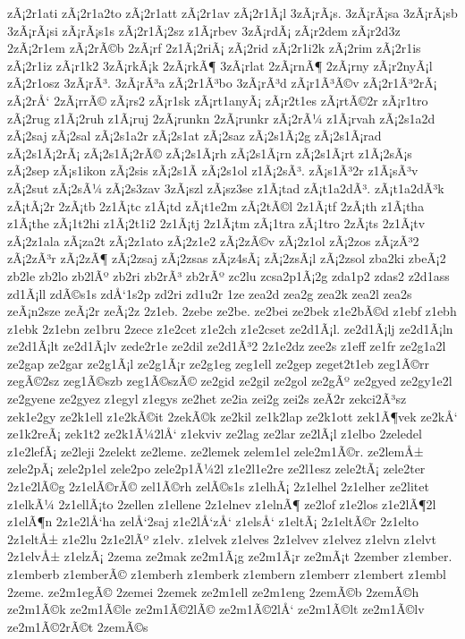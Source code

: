 {zÃ¡2r1ati
zÃ¡2r1a2to
zÃ¡2r1att
zÃ¡2r1av
zÃ¡2r1Ã¡l
3zÃ¡rÃ¡s.
3zÃ¡rÃ¡sa
3zÃ¡rÃ¡sb
3zÃ¡rÃ¡si
zÃ¡rÃ¡s1s
zÃ¡2r1Ã¡2sz
z1Ã¡rbev
3zÃ¡rdÃ¡
zÃ¡r2dem
zÃ¡r2d3z
2zÃ¡2r1em
zÃ¡2rÃ©b
2zÃ¡rf
2z1Ã¡2riÃ¡
zÃ¡2rid
zÃ¡2r1i2k
zÃ¡2rim
zÃ¡2r1is
zÃ¡2r1iz
zÃ¡r1k2
3zÃ¡rkÃ¡k
2zÃ¡rkÃ¶
3zÃ¡rlat
2zÃ¡rnÃ¶
2zÃ¡rny
zÃ¡r2nyÃ¡l
zÃ¡2r1osz
3zÃ¡rÃ³.
3zÃ¡rÃ³a
zÃ¡2r1Ã³bo
3zÃ¡rÃ³d
zÃ¡r1Ã³Ã©v
zÃ¡2r1Ã³2rÃ¡
zÃ¡2rÅ‘
2zÃ¡rrÃ©
zÃ¡rs2
zÃ¡r1sk
zÃ¡rt1anyÃ¡
zÃ¡r2t1es
zÃ¡rtÃ©2r
zÃ¡r1tro
zÃ¡2rug
z1Ã¡2ruh
z1Ã¡ruj
2zÃ¡runkn
2zÃ¡runkr
zÃ¡2rÃ¼
z1Ã¡rvah
zÃ¡2s1a2d
zÃ¡2saj
zÃ¡2sal
zÃ¡2s1a2r
zÃ¡2s1at
zÃ¡2saz
zÃ¡2s1Ã¡2g
zÃ¡2s1Ã¡rad
zÃ¡2s1Ã¡2rÃ¡
zÃ¡2s1Ã¡2rÃ©
zÃ¡2s1Ã¡rh
zÃ¡2s1Ã¡rn
zÃ¡2s1Ã¡rt
z1Ã¡2sÃ¡s
zÃ¡2sep
zÃ¡s1ikon
zÃ¡2sis
zÃ¡2s1Ã­
zÃ¡2s1ol
z1Ã¡2sÃ³.
zÃ¡s1Ã³2r
z1Ã¡sÃ³v
zÃ¡2sut
zÃ¡2sÃ¼
zÃ¡2s3zav
3zÃ¡szl
zÃ¡sz3se
z1Ã¡tad
zÃ¡t1a2dÃ³.
zÃ¡t1a2dÃ³k
zÃ¡tÃ¡2r
2zÃ¡tb
2z1Ã¡tc
z1Ã¡td
zÃ¡t1e2m
zÃ¡2tÃ©l
2z1Ã¡tf
2zÃ¡th
z1Ã¡tha
z1Ã¡the
zÃ¡1t2hi
z1Ã¡2t1i2
2z1Ã¡tj
2z1Ã¡tm
zÃ¡1tra
zÃ¡1tro
2zÃ¡ts
2z1Ã¡tv
zÃ¡2z1ala
zÃ¡za2t
zÃ¡2z1ato
zÃ¡2z1e2
zÃ¡2zÃ©v
zÃ¡2z1ol
zÃ¡2zos
zÃ¡zÃ³2
zÃ¡2zÃ³r
zÃ¡2zÃ¶
zÃ¡2zsaj
zÃ¡2zsas
zÃ¡z4sÃ¡
zÃ¡2zsÃ¡l
zÃ¡2zsol
zba2ki
zbeÃ¡2
zb2le
zb2lo
zb2lÃº
zb2ri
zb2rÃ³
zb2rÃº
zc2lu
zcsa2p1Ã¡2g
zda1p2
zdas2
z2d1ass
zd1Ã¡ll
zdÃ©s1s
zdÅ‘1s2p
zd2ri
zd1u2r
1ze
zea2d
zea2g
zea2k
zea2l
zea2s
zeÃ¡n2sze
zeÃ¡2r
zeÃ¡2z
2z1eb.
2zebe
ze2be.
ze2bei
ze2bek
z1e2bÃ©d
z1ebf
z1ebh
z1ebk
2z1ebn
ze1bru
2zece
z1e2cet
z1e2ch
z1e2cset
ze2d1Ã¡l.
ze2d1Ã¡lj
ze2d1Ã¡ln
ze2d1Ã¡lt
ze2d1Ã¡lv
zede2r1e
ze2dil
ze2d1Ã³2
2z1e2dz
zee2s
z1eff
ze1fr
ze2g1a2l
ze2gap
ze2gar
ze2g1Ã¡l
ze2g1Ã¡r
ze2g1eg
zeg1ell
ze2gep
zeget2t1eb
zeg1Ã©rr
zegÃ©2sz
zeg1Ã©szb
zeg1Ã©szÃ©
ze2gid
ze2gil
ze2gol
ze2gÃº
ze2gyed
ze2gy1e2l
ze2gyene
ze2gyez
z1egyl
z1egys
ze2het
ze2ia
zei2g
zei2s
zeÃ­2r
zekci2Ã³sz
zek1e2gy
ze2k1ell
z1e2kÃ©it
2zekÃ©k
ze2kil
ze1k2lap
ze2k1ott
zek1Ã¶vek
ze2kÅ‘
ze1k2reÃ¡
zek1t2
ze2k1Ã¼2lÅ‘
z1ekviv
ze2lag
ze2lar
ze2lÃ¡l
z1elbo
2zeledel
z1e2lefÃ¡
ze2leji
2zelekt
ze2leme.
ze2lemek
zelem1el
zele2m1Ã©r.
ze2lemÅ±
zele2pÃ¡
zele2p1el
zele2po
zele2p1Ã¼2l
z1e2l1e2re
ze2l1esz
zele2tÃ¡
zele2ter
2z1e2lÃ©g
2z1elÃ©rÃ©
zel1Ã©rh
zelÃ©s1s
z1elhÃ¡
2z1elhel
2z1elher
ze2litet
z1elkÃ¼
2z1ellÃ¡to
2zellen
z1ellene
2z1elnev
z1elnÃ¶
ze2lof
z1e2los
z1e2lÃ¶2l
z1elÃ¶n
2z1e2lÅ‘ha
zelÅ‘2saj
z1e2lÅ‘zÅ‘
z1elsÅ‘
z1eltÃ¡
2z1eltÃ©r
2z1elto
2z1eltÅ±
z1e2lu
2z1e2lÃº
z1elv.
z1elvek
z1elves
2z1elvev
z1elvez
z1elvn
z1elvt
2z1elvÅ±
z1elzÃ¡
2zema
ze2mak
ze2m1Ã¡g
ze2m1Ã¡r
ze2mÃ¡t
2zember
z1ember.
z1emberb
z1emberÃ©
z1emberh
z1emberk
z1embern
z1emberr
z1embert
z1embl
2zeme.
ze2m1egÃ©
2zemei
2zemek
ze2m1ell
ze2m1eng
2zemÃ©b
2zemÃ©h
ze2m1Ã©k
ze2m1Ã©le
ze2m1Ã©2lÃ©
ze2m1Ã©2lÅ‘
ze2m1Ã©lt
ze2m1Ã©lv
ze2m1Ã©2rÃ©t
2zemÃ©s
}
